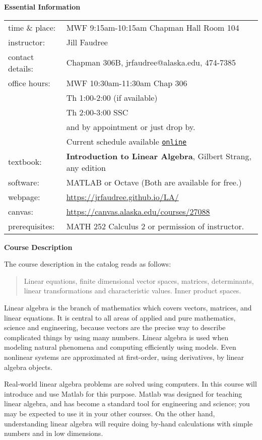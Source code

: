 \documentclass[12pt]{article}
\begin{document}
\textbf{\large{Essential Information}}

\begin{tabular}{p{} p{}}
{time \& place}:&MWF 9:15am-10:15am Chapman Hall Room 104\\
{instructor:} &Jill Faudree\\
{contact details:} &Chapman 306B, jrfaudree@alaska.edu, 474-7385\\
{office hours:} & MWF 10:30am-11:30am  Chap 306\\
& Th 1:00-2:00 (if available) \\
&Th 2:00-3:00 SSC\\
&and by appointment or just drop by.\\
&Current schedule available \href{https://docs.google.com/spreadsheets/d/e/2PACX-1vTh65fkl5DpmD3PzPa8Kua2tzvb4Our1Nhk8DoVGuP0t3LApdM4Lne4BR9tTcgcxuE5Y5TOwwSSEtKq/pubhtml?gid=0&single=true}{\texttt{online}}\\
{textbook:}& \textbf{Introduction to Linear Algebra}, Gilbert Strang, any edition\\
{software:}& MATLAB or Octave (Both are available for free.)\\
{webpage:}& \url{https://jrfaudree.github.io/LA/}\\
canvas:&\url{https://canvas.alaska.edu/courses/27088}\\
{prerequisites:} & MATH 252 Calculus 2 or permission of instructor.
\end{tabular}



\textbf{\large{Course Description}}

The course description in the catalog reads as follows:
\begin{quote} Linear equations, finite dimensional vector spaces, matrices, determinants, linear transformations and characteristic values. Inner product spaces. \end{quote}

Linear algebra is the branch of mathematics which covers vectors, matrices, and linear equations.  It is central to all areas of applied and pure mathematics, science and engineering, because vectors are the precise way to describe complicated things by using many numbers.  Linear algebra is used when modeling natural phenomena and computing efficiently using models.  Even nonlinear systems are approximated at first-order, using derivatives, by linear algebra objects.

Real-world linear algebra problems are solved using computers.  In this course will introduce and use Matlab for this purpose.  Matlab was designed for teaching linear algebra, and has become a standard tool for engineering and science; you may be expected to use it in your other courses.  On the other hand, understanding linear algebra will require doing by-hand calculations with simple numbers and in low dimensions.
\end{document}
